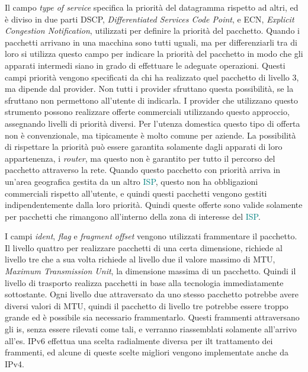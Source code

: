 \documentclass{article}
\numberwithin{equation}{subsection}
\begin{document}
Il campo \textit{type of service} specifica la priorità del datagramma rispetto ad altri, ed è diviso in due parti DSCP, \textit{Differentiated Services Code Point}, e 
ECN, \textit{Explicit Congestion Notification}, utilizzati per definire la priorità del pacchetto. 
Quando i pacchetti arrivano in una macchina sono tutti uguali, ma per differenziarli tra di loro si utilizza questo campo per indicare la priorità del pacchetto in 
modo che gli apparati intermedi siano in grado di effettuare le adeguate operazioni. Questi campi priorità vengono specificati da chi ha realizzato quel pacchetto di livello 3, 
ma dipende dal provider. Non tutti i provider sfruttano questa possibilità, se la sfruttano non permettono all'utente di indicarla.
I provider che utilizzano questo strumento possono realizzare offerte commerciali utilizzando questo approccio, assegnando livelli di priorità diversi. Per l'utenza 
domestica questo tipo di offerta non è convenzionale, ma tipicamente è molto comune per aziende. 
La possibilità di rispettare la priorità può essere garantita solamente dagli apparati di loro appartenenza, i \textit{router}, ma questo non è garantito per tutto il 
percorso del pacchetto attraverso la rete. Quando questo pacchetto con priorità arriva in un'area geografica gestita da un altro \textcolor{teal}{ISP}, questo non ha obbligazioni 
commerciali rispetto all'utente, e quindi questi pacchetti vengono gestiti indipendentemente dalla loro priorità. 
Quindi queste offerte sono valide solamente per pacchetti che rimangono all'interno della zona di interesse del \textcolor{teal}{ISP}. 

I campi \textit{ident}, \textit{flag} e \textit{fragment offset} vengono utilizzati frammentare il pacchetto. 
Il livello quattro per realizzare pacchetti di una certa dimensione, richiede al livello tre che a sua volta richiede al livello due il valore massimo di \textcolor{RoyalPurple}{MTU}, \textit{Maximum Transmission Unit}, la dimensione massima di un pacchetto. Quindi il livello di trasporto realizza pacchetti in base alla tecnologia immediatamente 
sottostante. Ogni livello due attraversato da uno stesso pacchetto potrebbe avere diversi valori di \textcolor{RoyalPurple}{MTU}, quindi il pacchetto di livello tre potrebbe essere troppo 
grande ed è possibile sia necessario frammentarlo. Questi frammenti attraversano gli \textcolor{Emerald}{is}, senza essere rilevati come tali, e verranno riassemblati solamente all'arrivo all'\textcolor{Periwinkle}{es}. 
\textcolor{OliveGreen}{IPv6} effettua una scelta radialmente diversa per ilt trattamento dei frammenti, ed alcune di queste scelte migliori vengono implementate anche da \textcolor{BurntOrange}{IPv4}. 
\end{document}
